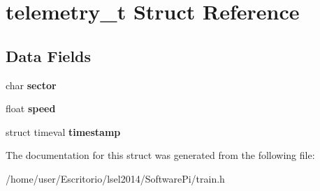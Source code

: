 \hypertarget{structtelemetry__t}{\section{telemetry\-\_\-t \-Struct \-Reference}
\label{structtelemetry__t}
}
\subsection*{\-Data \-Fields}
\begin{DoxyCompactItemize}
\item 
\hypertarget{structtelemetry__t_a9a7ab9e5921f6a66a60c64dc69bb8414}{char {\bfseries sector}}\label{structtelemetry__t_a9a7ab9e5921f6a66a60c64dc69bb8414}

\item 
\hypertarget{structtelemetry__t_a5d83531eda868eb68af5fc94b550906a}{float {\bfseries speed}}\label{structtelemetry__t_a5d83531eda868eb68af5fc94b550906a}

\item 
\hypertarget{structtelemetry__t_a5e49bfa2b771f0be3c0c94ec87633b6d}{struct timeval {\bfseries timestamp}}\label{structtelemetry__t_a5e49bfa2b771f0be3c0c94ec87633b6d}

\end{DoxyCompactItemize}


\-The documentation for this struct was generated from the following file\-:\begin{DoxyCompactItemize}
\item 
/home/user/\-Escritorio/lsel2014/\-Software\-Pi/train.\-h\end{DoxyCompactItemize}
